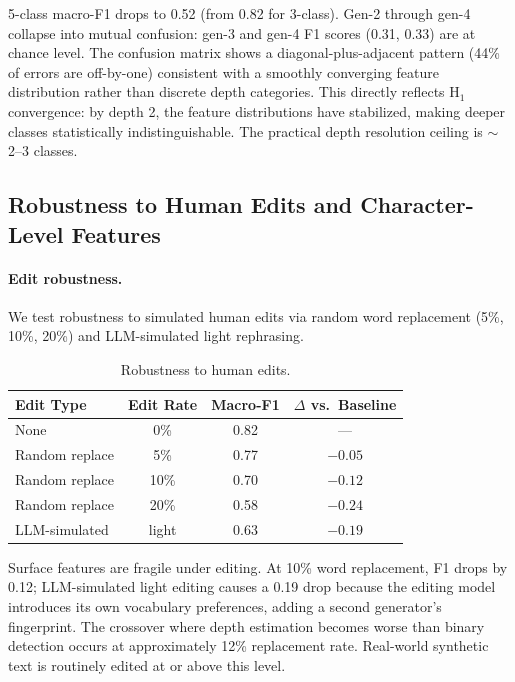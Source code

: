 \documentclass[letterpaper]{article}
\begin{document}
5-class macro-F1 drops to 0.52 (from 0.82 for 3-class). Gen-2 through gen-4 collapse into mutual confusion: gen-3 and gen-4 F1 scores (0.31, 0.33) are at chance level. The confusion matrix shows a diagonal-plus-adjacent pattern (44\% of errors are off-by-one) consistent with a smoothly converging feature distribution rather than discrete depth categories. This directly reflects H$_1$ convergence: by depth 2, the feature distributions have stabilized, making deeper classes statistically indistinguishable. The practical depth resolution ceiling is $\sim$2--3 classes.

\subsection{Robustness to Human Edits and Character-Level Features}
\label{sec:robustness}

\paragraph{Edit robustness.}
We test robustness to simulated human edits via random word replacement (5\%, 10\%, 20\%) and LLM-simulated light rephrasing.

\begin{table}[h]
\centering
\caption{Robustness to human edits.}
\label{tab:edits}
\begin{tabular}{lccc}
\toprule
Edit Type & Edit Rate & Macro-F1 & $\Delta$ vs.\ Baseline \\
\midrule
None & 0\% & 0.82 & --- \\
Random replace & 5\% & 0.77 & $-0.05$ \\
Random replace & 10\% & 0.70 & $-0.12$ \\
Random replace & 20\% & 0.58 & $-0.24$ \\
LLM-simulated & light & 0.63 & $-0.19$ \\
\bottomrule
\end{tabular}
\end{table}

Surface features are fragile under editing. At 10\% word replacement, F1 drops by 0.12; LLM-simulated light editing causes a 0.19 drop because the editing model introduces its own vocabulary preferences, adding a second generator's fingerprint. The crossover where depth estimation becomes worse than binary detection occurs at approximately 12\% replacement rate. Real-world synthetic text is routinely edited at or above this level.
\end{document}
